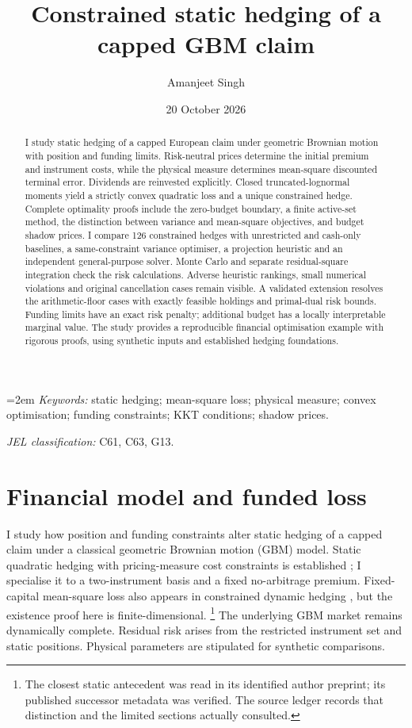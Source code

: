 \documentclass[11pt]{article}
\title{Constrained static hedging of a capped GBM claim}
\author{Amanjeet Singh}
\date{20 October 2026}
\begin{document}
\maketitle
\begin{abstract}
I study static hedging of a capped European claim under geometric Brownian
motion with position and funding limits. Risk-neutral prices determine the
initial premium and instrument costs, while the physical measure determines
mean-square discounted terminal error. Dividends are reinvested explicitly.
Closed truncated-lognormal moments yield a strictly convex quadratic loss
and a unique constrained hedge. Complete optimality proofs include the
zero-budget boundary, a finite active-set method, the distinction between
variance and mean-square objectives, and budget shadow prices. I compare
126 constrained hedges with unrestricted and cash-only baselines, a
same-constraint variance optimiser, a projection heuristic and an independent
general-purpose solver. Monte Carlo and separate residual-square integration
check the risk calculations. Adverse heuristic rankings, small numerical
violations and original cancellation cases remain visible. A validated
extension resolves the arithmetic-floor cases with exactly feasible
holdings and primal-dual risk bounds. Funding limits
have an exact risk penalty; additional budget has a locally interpretable
marginal value. The study provides a reproducible financial optimisation
example with rigorous proofs, using synthetic inputs and established hedging
foundations.
\end{abstract}
\noindent\begin{minipage}{\linewidth}
\small\emergencystretch=2em
\textit{Keywords:} static hedging; mean-square loss; physical measure;
convex optimisation; funding constraints; KKT conditions; shadow prices.\par
\smallskip\textit{JEL classification:} C61, C63, G13.\par
\end{minipage}
\section{Financial model and funded loss}
\label{sec:h-model}

I study how position and funding constraints alter static hedging of a
capped claim under a classical geometric Brownian motion (GBM) model.
Static quadratic hedging with pricing-measure cost constraints is
established \citep{leunglorig2016}; I specialise it to a two-instrument
basis and a fixed no-arbitrage premium. Fixed-capital mean-square loss
also appears in constrained dynamic hedging \citep{czichowskyschweizer2012},
but the existence proof here is finite-dimensional.
\footnote{The closest static antecedent was read in its identified author
preprint; its published successor metadata was verified. The source ledger
records that distinction and the limited sections actually consulted.}
The underlying GBM market remains dynamically complete. Residual risk
arises from the restricted instrument set and static positions. Physical
parameters are stipulated for synthetic comparisons.
\end{document}
